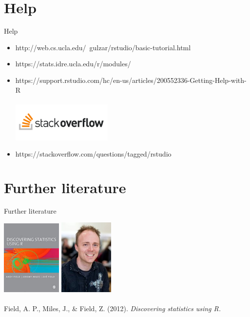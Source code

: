 \documentclass{beamer}
\begin{document}
\section{Help}
\begin{frame}{Help}
\begin{itemize}
    \item http://web.cs.ucla.edu/~gulzar/rstudio/basic-tutorial.html
    \item https://stats.idre.ucla.edu/r/modules/
    \item https://support.rstudio.com/hc/en-us/articles/200552336-Getting-Help-with-R \\
    \hspace{3cm} \\
\includegraphics[width = 5cm]{st.png} 
    \item https://stackoverflow.com/questions/tagged/rstudio
\end{itemize}
\end{frame}

\section{Further literature}
\begin{frame}{Further literature}

\hspace{3cm}
\includegraphics[width= 3cm]{ad.jpg}
\includegraphics[width= 2.7cm]{af.jpg} \\
\vspace{1cm}
\\
Field, A. P., Miles, J., & Field, Z. (2012). \textit{Discovering statistics using R.}\\
\end{frame}
\end{document}
